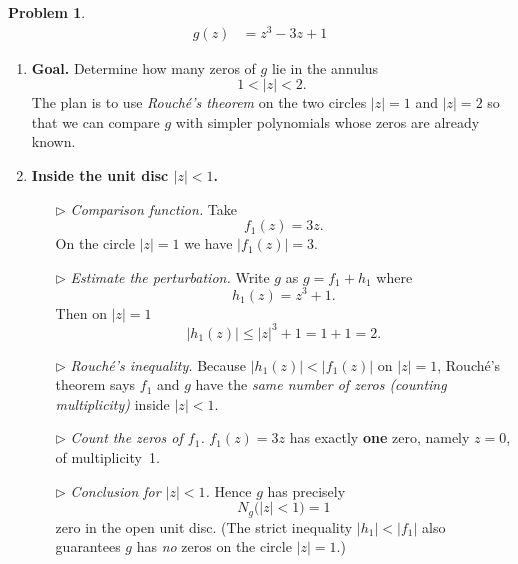 \documentclass[12pt]{article}
\theoremstyle{definition} %
\newtheorem{problem}{Problem}
\theoremstyle{plain} %
\begin{document}
\begin{problem}
    \begin{align}
        g(z) &= z^{3}-3z+1
    \end{align}

    \begin{enumerate}

        \item \textbf{Goal.}  
              Determine how many zeros of $g$ lie in the annulus  
              $$1<|z|<2.$$
              The plan is to use \emph{Rouché’s theorem} on the two circles  
              $|z|=1$ and $|z|=2$ so that we can compare $g$ with simpler
              polynomials whose zeros are already known.

        \item \textbf{Inside the unit disc $|z|<1$.}

              \begin{enumerate}
                  \item[$\triangleright$] \emph{Comparison function.}  
                        Take
                        $$f_{1}(z)=3z.$$
                        On the circle $|z|=1$ we have $|f_{1}(z)|=3$.

                  \item[$\triangleright$] \emph{Estimate the perturbation.}  
                        Write $g$ as $g=f_{1}+h_{1}$ where
                        $$h_{1}(z)=z^{3}+1.$$
                        Then on $|z|=1$
                        $$|h_{1}(z)|\le|z|^{3}+1 = 1+1 = 2.$$

                  \item[$\triangleright$] \emph{Rouché’s inequality.}  
                        Because $|h_{1}(z)|<|f_{1}(z)|$ on $|z|=1$,  
                        Rouché’s theorem says $f_{1}$ and $g$ have the
                        \emph{same number of zeros (counting multiplicity)}
                        inside $|z|<1$.

                  \item[$\triangleright$] \emph{Count the zeros of $f_{1}$.}  
                        $f_{1}(z)=3z$ has exactly \textbf{one} zero, namely $z=0$,
                        of multiplicity 1.

                  \item[$\triangleright$] \emph{Conclusion for $|z|<1$.}  
                        Hence $g$ has precisely  
                        $$N_{g}\bigl(|z|<1\bigr)=1$$
                        zero in the open unit disc.  
                        (The strict inequality $|h_{1}|<|f_{1}|$ also guarantees
                        $g$ has \emph{no} zeros on the circle $|z|=1$.)
              \end{enumerate}


\end{enumerate}
\end{problem}
\end{document}
